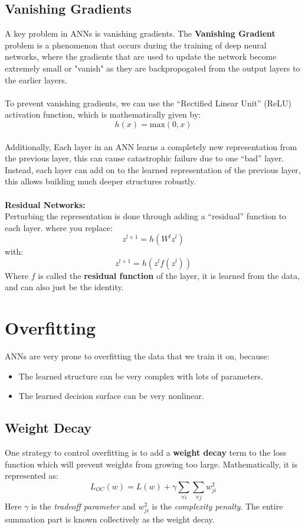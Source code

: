 \documentclass[12pt, a4paper]{book}
\begin{document}
\subsection{Vanishing Gradients}
A key problem in ANNs is vanishing gradients. The \textbf{Vanishing Gradient} problem is a phenomenon that occurs during the training of deep neural networks, where the gradients that are used to update the network become extremely small or "vanish" as they are backpropogated from the output layers to the earlier layers.\\\\
To prevent vanishing gradients, we can use the “Rectified Linear Unit” (ReLU) activation function, which is mathematically given by:
$$h(x) = \text{max}(0,x)$$\\
Additionally, Each layer in an ANN learns a completely new
representation from the previous layer, this can cause catastrophic failure due to one “bad” layer. Instead, each layer can add on to the learned representation of the previous layer, this allows building much deeper structures robustly.\\\\
\textbf{Residual Networks:}\\
Perturbing the representation is done through adding a “residual” function to each layer. where you replace:
$$z^{l+1} = h(W^lz^l)$$
with:
$$z^{l+1} = h(z^l f(z^l))$$
Where $f$ is called the \textbf{residual function} of the layer, it is learned from the data, and can also just be the identity.\\

\section{Overfitting}
ANNs are very prone to overfitting the data that we train it on, because:
\begin{itemize}
    \item The learned structure can be very complex with lots of parameters.
    \item The learned decision surface can be very nonlinear.\\
\end{itemize}
\subsection{Weight Decay}
One strategy to control overfitting is to add a \textbf{weight decay} term to the loss function which will prevent weights from growing too large. Mathematically, it is represented as:
$$L_{OC}(w) = L(w) + \gamma\sum_{\forall i}\sum_{\forall j}w_{ji}^2$$
Here $\gamma$ is the \textit{tradeoff parameter} and $w_{ji}^2$ is the \textit{complexity penalty}. The entire summation part is known collectively as the weight decay.
\end{document}
